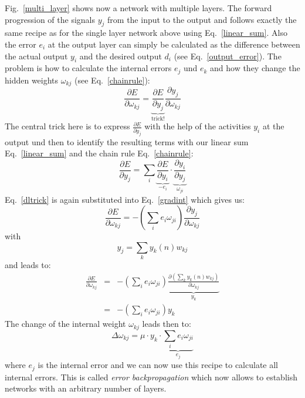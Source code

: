 \documentclass[12pt]{article}
\begin{document}
Fig.~\ref{multi_layer} shows now a network with multiple layers.
The forward progression of the signals $y_j$ from the input to
the output and follows exactly the same recipe as for the single
layer network above using Eq.~\ref{linear_sum}.
Also the error $e_i$ at the output layer can simply be calculated
as the difference between the actual output $y_i$ and the desired output $d_i$ (see
Eq.~\ref{output_error}). The problem is how to calculate the
internal errors $e_j$ und $e_k$ and how they change the hidden weights $\omega_{kj}$
(see Eq.~\ref{chainrule}):
\begin{equation}
  \frac{\partial E}{\partial \omega_{kj}} = \underbrace{\frac{\partial E}{\partial y_j}}_\textrm{trick!} \frac{\partial y_j}{\partial \omega_{kj}}
  \label{gradint}
\end{equation}
The central trick here is to express $\frac{\partial E}{\partial y_j}$
with the help of the activities $y_i$ at the output und then to
identify the resulting terms with our linear sum Eq.~\ref{linear_sum}
and the chain rule Eq.~\ref{chainrule}:
\begin{equation}
  \frac{\partial E}{\partial y_j} = \sum_i \underbrace{\frac{\partial E}{\partial y_i}}_{-e_i} \cdot \underbrace{\frac{\partial y_i}{\partial y_j}}_{\omega_{ji}} \label{dltrick}
\end{equation}
Eq.~\ref{dltrick} is again substituted into Eq.~\ref{gradint} which gives us:
\begin{equation}
  \frac{\partial E}{\partial \omega_{kj}} = - \left( \sum_i e_i \omega_{ji} \right) \frac{\partial y_j}{\partial \omega_{kj}}
  \label{gradintback}
\end{equation}
with
\begin{equation}
y_j = \sum_k y_k(n) w_{kj}
\end{equation}
and leads to:
\begin{eqnarray}
  \frac{\partial E}{\partial \omega_{kj}} & = & - \left( \sum_i e_i \omega_{ji} \right) \underbrace{\frac{\partial \left(\sum_k y_k(n) w_{kj}\right)}{\partial \omega_{kj}}}_{y_k} \\
                                         & = & - \left( \sum_i e_i \omega_{ji} \right) y_k
\end{eqnarray}
The change of the internal weight $\omega_{kj}$ leads then to:
\begin{equation}
\Delta\omega_{kj} = \mu \cdot y_k \cdot \underbrace{\sum_i e_i \omega_{ji}}_{e_j}
\end{equation}
where $e_j$ is the internal error and we can now use this recipe to
calculate all internal errors.  This is called \textsl{error
  backpropagation} which now allows to establish networks with an
arbitrary number of layers.
\end{document}
